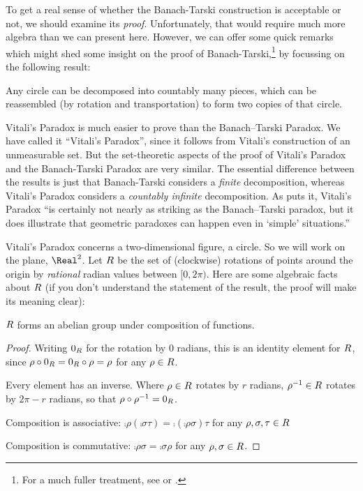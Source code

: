 \documentclass[../../../include/open-logic-section]{subfiles}
\begin{document}

To get a real sense of whether the Banach-Tarski construction is
acceptable or not, we should examine its \emph{proof}. Unfortunately,
that would require much more algebra than we can present here.
However, we can offer some quick remarks which might shed some insight
on the proof of Banach-Tarski,\footnote{For a much fuller treatment,
see \cite{Weston2003} or \cite{Wagon2016}.} by focussing on the
following result:

\begin{thm}
Any circle can be decomposed into countably many pieces, which can be
reassembled (by rotation and transportation) to form two copies of
that circle.
\end{thm}

Vitali's Paradox is much easier to prove than the Banach--Tarski Paradox. We have
called it ``Vitali's Paradox'', since it follows from Vitali's
\citeyear{Vitali1905} construction of an unmeasurable set.  But the
set-theoretic aspects of the proof of Vitali's Paradox and the
Banach-Tarski Paradox are very similar. The essential difference
between the results is just that Banach-Tarski considers a
\emph{finite} decomposition, whereas Vitali's Paradox considers a
\emph{countably infinite} decomposition.  As \citet{Weston2003}
puts it, Vitali's Paradox ``is certainly not nearly as striking as the
Banach--Tarski paradox, but it does illustrate that geometric
paradoxes can  happen even in `simple' situations.'' 

Vitali's Paradox concerns a two-dimensional figure, a circle. So we
will work on the plane, $\Real^2$. Let $R$ be the set of
(clockwise) rotations of points around the origin by \emph{rational}
radian values between $[0,2\pi)$. Here are some algebraic facts about
$R$ (if you don't understand the statement of the
result, the proof will make its meaning clear):

\begin{lem}
$R$ forms an abelian {group} under composition of functions.
\end{lem}

\begin{proof}
Writing $0_{R}$ for the rotation by $0$ radians, this is
an identity element for $R$, since
$\rho \circ 0_{R} = 0_{R} \circ \rho =
\rho$ for any $\rho \in R$.

Every element has an inverse. Where $\rho \in R$ rotates
by $r$ radians, $\rho^{-1} \in R$ rotates by $2\pi - r$
radians, so that $\rho \circ \rho^{-1} = 0_R$.

Composition is associative: $\comp{\rho}{(\comp{\sigma}{\tau})} =
\comp{(\comp{\rho}{\sigma})}{\tau}$ for any $\rho, \sigma, \tau \in
R$

Composition is commutative: $\comp{\rho}{\sigma} =
\comp{\sigma}{\rho}$ for any $\rho, \sigma \in R$.
\end{proof}
\end{document}
